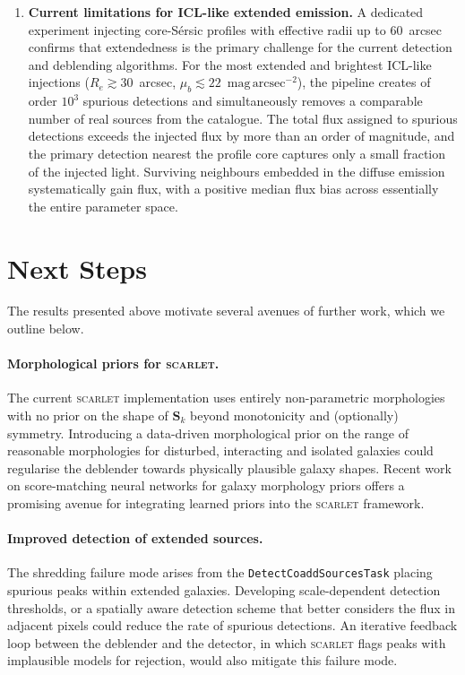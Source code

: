 \documentclass[DM,lsstdraft,authoryear,toc]{lsstdoc}
\newcommand{\scarlet}{\textsc{scarlet}\xspace}
\newcommand{\task}[1]{\texttt{#1}\xspace}
\begin{document}
\begin{enumerate}
  \item \textbf{Current limitations for ICL-like extended emission.} A
    dedicated experiment injecting core-S\'{e}rsic profiles with effective
    radii up to 60~arcsec confirms that extendedness is the primary
    challenge for the current detection and deblending algorithms. For the
    most extended and
    brightest ICL-like injections ($R_e \gtrsim 30$~arcsec,
    $\mu_b \lesssim 22$~$\mathrm{mag\,arcsec^{-2}}$), the pipeline
    creates of order $10^3$ spurious detections and simultaneously removes
    a comparable number of real sources from the catalogue. The total flux
    assigned to spurious detections exceeds the injected flux by more than
    an order of magnitude, and the primary detection nearest the profile
    core captures only a small fraction of the injected light. Surviving
    neighbours embedded in the diffuse emission systematically gain flux,
    with a positive median flux bias across essentially the entire
    parameter space.
\end{enumerate}


\section{Next Steps}
\label{sec:nextsteps}

The results presented above motivate several avenues of further work, which
we outline below.

\paragraph{Morphological priors for \scarlet.}
The current \scarlet implementation uses entirely non-parametric morphologies
with no prior on the shape of $\mathbf{S}_k$ beyond monotonicity and
(optionally) symmetry. Introducing a data-driven morphological prior on the range of
reasonable morphologies for disturbed, interacting and isolated galaxies
could regularise the deblender towards physically plausible galaxy shapes. 
Recent work on score-matching neural networks for galaxy morphology priors \citep{Sampson2024} offers a promising
avenue for integrating learned priors into the \scarlet framework.

\paragraph{Improved detection of extended sources.}
The shredding failure mode arises from the \task{DetectCoaddSourcesTask}
placing spurious peaks within extended galaxies. Developing scale-dependent
detection thresholds, or a spatially aware detection scheme that better considers the flux
in adjacent pixels could reduce the rate of spurious detections.
An iterative feedback loop between the deblender and the detector, in which \scarlet flags peaks with
implausible models for rejection, would also mitigate this failure mode.
\end{document}

